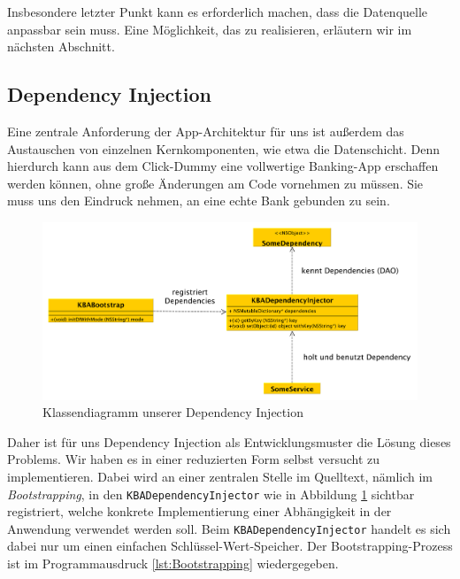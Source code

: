 	Insbesondere letzter Punkt kann es erforderlich machen, dass die Datenquelle anpassbar sein muss. Eine Möglichkeit, das zu realisieren, erläutern wir im nächsten Abschnitt.

\subsection{Dependency Injection}
%
%
	Eine zentrale Anforderung der App-Architektur für uns ist außerdem das Austauschen von einzelnen Kernkomponenten, wie etwa die Datenschicht. Denn hierdurch kann aus dem Click-Dummy eine vollwertige Banking-App erschaffen werden können, ohne große Änderungen am Code vornehmen zu müssen. Sie muss uns den Eindruck nehmen, an eine echte Bank gebunden zu sein.
	
\begin{figure}[h]
	\centering
	\includegraphics[scale=.25]{Pictures/uml-di}
	\caption{Klassendiagramm unserer Dependency Injection\label{fig:UmlDi}}
\end{figure}
	
	Daher ist für uns Dependency Injection als Entwicklungsmuster die Lösung dieses Problems. Wir haben es in einer reduzierten Form selbst versucht zu implementieren. Dabei wird an einer zentralen Stelle im Quelltext, nämlich im \emph{Bootstrapping}, in den \texttt{KBADependencyInjector} wie in Abbildung \ref{fig:UmlDi} sichtbar registriert, welche konkrete Implementierung einer Abhängigkeit in der Anwendung verwendet werden soll. Beim \texttt{KBADependencyInjector} handelt es sich dabei nur um einen einfachen Schlüssel-Wert-Speicher. Der Bootstrapping-Prozess ist im Programmausdruck \ref{lst:Bootstrapping} wiedergegeben.
	
